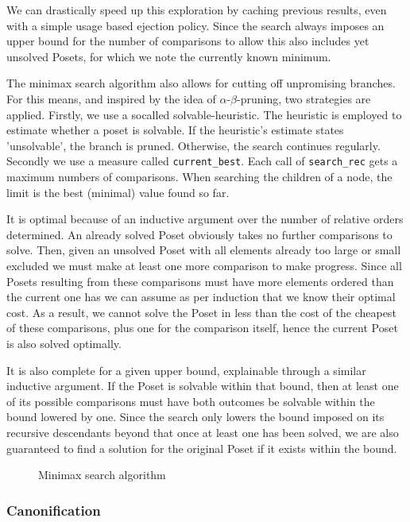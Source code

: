\documentclass[10pt,journal,compsoc]{IEEEtran}
\begin{document}
We can drastically speed up this exploration by caching previous results, even with a simple usage
based ejection policy. Since the search always imposes an upper bound for the number of comparisons
to allow this also includes yet unsolved Posets, for which we note the currently known minimum.

The minimax search algorithm also allows for cutting off unpromising branches. For this means, and inspired by the idea of $\alpha$-$\beta$-pruning, two strategies are applied.
Firstly, we use a socalled solvable-heuristic.
The heuristic is employed to estimate whether a poset is solvable. If the heuristic's estimate states 'unsolvable', the branch is pruned.
Otherwise, the search continues regularly.
Secondly we use a measure called \texttt{current\_best}.
Each call of \texttt{search\_rec} gets a maximum numbers of comparisons. When searching the children of a node, the limit is the best (minimal) value found so far.

It is optimal because of an inductive argument over the number of relative orders determined. An
already solved Poset obviously takes no further comparisons to solve. Then, given an unsolved Poset
with all elements already too large or small excluded we must make at least one more comparison to
make progress. Since all Posets resulting from these comparisons must have more elements ordered
than the current one has we can assume as per induction that we know their optimal cost. As a result, we
cannot solve the Poset in less than the cost of the cheapest of these comparisons, plus one for the
comparison itself, hence the current Poset is also solved optimally.

It is also complete for a given upper bound, explainable through a similar inductive argument. If
the Poset is solvable within that bound, then at least one of its possible comparisons must have both
outcomes be solvable within the bound lowered by one. Since the search only lowers the bound imposed
on its recursive descendants beyond that once at least one has been solved, we are also guaranteed
to find a solution for the original Poset if it exists within the bound.

\begin{figure}
  
  \caption{Minimax search algorithm}
  \label{fig:minimax_search}
\end{figure}

\subsubsection{Canonification}
\end{document}
